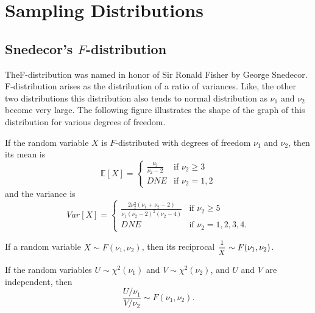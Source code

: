 \chapter{Sampling Distributions}

\section{Snedecor's $F$-distribution}

TheF-distribution was named in honor of Sir Ronald Fisher by George
Snedecor. F-distribution arises as the distribution of a ratio of variances.
Like, the other two distributions this distribution also tends to normal 
distribution as $\nu_1$ and $\nu_2$ become very large. The
following figure illustrates the
 shape of the graph of this distribution for various degrees of freedom.

\begin{theorem}
If the random variable $X$ is $F$-distributed with degrees 
of freedom $\nu_1$ and $\nu_2$, then its mean is 
\begin{equation}
    \mathbb{E}[X] = \begin{cases}
        \displaystyle \frac{\nu_2}{\nu_2 - 2} & \text{if } \nu_2 \geq 3\\
        DNE & \text{if } \nu_2 = 1,2
    \end{cases}
\end{equation}
and the variance is 
\begin{equation}
    Var[X] = \begin{cases}
        \displaystyle \frac{2\nu^2_2 (\nu_1 + \nu_2 - 2)}{\nu_1 (\nu_2 - 2)^2 (\nu_2 - 4)} & \text{if } \nu_2 \geq 5\\
        DNE & \text{if } \nu_2 = 1,2,3,4.
    \end{cases}
\end{equation}
\end{theorem}

\begin{theorem}
    If a random variable $X \sim F(\nu_1, \nu_2)$, then its reciprocal $\mfrac{1}{X} \sim F(\nu_1, \nu_2)$.
\end{theorem}

\begin{theorem}
    If the random variables $U \sim \chi^2(\nu_1)$ and $V \sim \chi^2(\nu_2)$, and 
    $U$ and $V$ are independent, then 
    \begin{equation}
        \frac{U/\nu_1}{V/\nu_2} \sim F(\nu_1, \nu_2).
    \end{equation}
\end{theorem}


